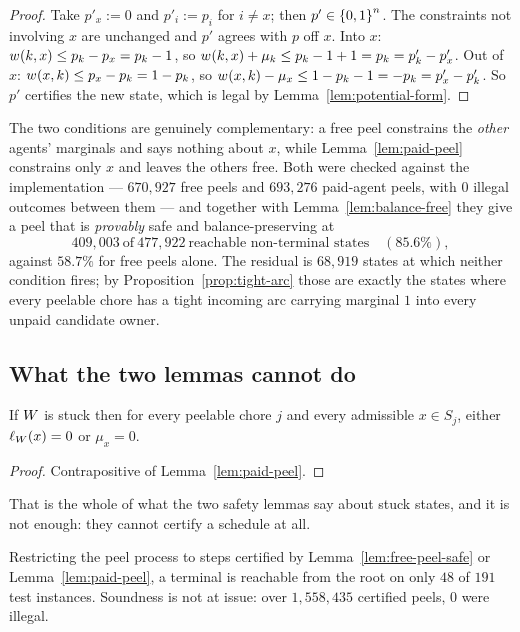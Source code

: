 \begin{proof}
Take $p'_x := 0$ and $p'_i := p_i$ for $i \ne x$; then $p' \in \left\{0,1\right\}^n$. The
constraints not involving $x$ are unchanged and $p'$ agrees with $p$ off $x$.
Into $x$: $w_{}(k,x) \le p_k - p_x = p_k - 1$, so
$w_{}(k,x) + \mu_k \le p_k - 1 + 1 = p_k = p'_k - p'_x$. Out of $x$:
$w_{}(x,k) \le p_x - p_k = 1 - p_k$, so
$w_{}(x,k) - \mu_x \le 1 - p_k - 1 = -p_k = p'_x - p'_k$. So $p'$ certifies
the new state, which is legal by Lemma~\ref{lem:potential-form}.
\end{proof}

The two conditions are genuinely complementary: a free peel constrains the
\emph{other} agents' marginals and says nothing about $x$, while
Lemma~\ref{lem:paid-peel} constrains only $x$ and leaves the others free. Both
were checked against the implementation --- $670{,}927$ free peels and
$693{,}276$ paid-agent peels, with $0$ illegal outcomes between them --- and
together with Lemma~\ref{lem:balance-free} they give a peel that is
\emph{provably} safe and balance-preserving at
\[
  409{,}003 \ \text{of} \ 477{,}922 \ \text{reachable non-terminal states}
  \quad (85.6\%),
\]
against $58.7\%$ for free peels alone. The residual is $68{,}919$ states at
which neither condition fires; by Proposition~\ref{prop:tight-arc} those are
exactly the states where every peelable chore has a tight incoming arc carrying
marginal $1$ into every unpaid candidate owner.

\subsection{What the two lemmas cannot do}
\label{sec:peel-lemma-limits}

\begin{corollary}
\label{cor:stuck-structure}
If $W$ is stuck then for every peelable chore $j$ and every admissible
$x \in S_j$, either $\ell_{W}(x) = 0$ or $\mu_x = 0$.
\end{corollary}

\begin{proof}
Contrapositive of Lemma~\ref{lem:paid-peel}.
\end{proof}

That is the whole of what the two safety lemmas say about stuck states, and it is
not enough: they cannot certify a schedule at all.

\begin{proposition}
\label{prop:lemmas-insufficient}
Restricting the peel process to steps certified by
Lemma~\ref{lem:free-peel-safe} or Lemma~\ref{lem:paid-peel}, a terminal is
reachable from the root on only $48$ of $191$ test instances. Soundness is not at
issue: over $1{,}558{,}435$ certified peels, $0$ were illegal.
\end{proposition}

